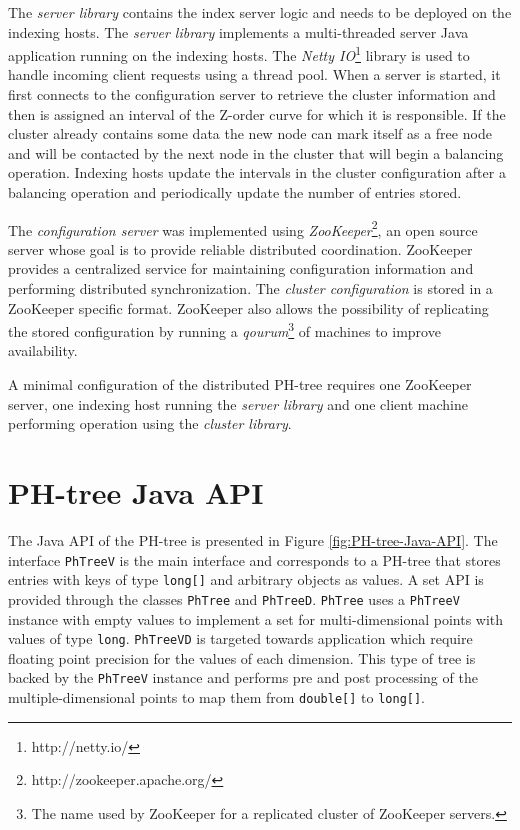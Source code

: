 \documentclass[11pt,a4paper]{globis-book}
\begin{document}
The \textit{server library} contains the index server logic and needs to be deployed on the indexing hosts. The \textit{server library} implements a multi-threaded server Java application running on the indexing hosts. The \textit{Netty IO}\footnote{http://netty.io/} library is used to handle incoming client requests using a thread pool. When a server is started, it first connects to the configuration server to retrieve the cluster information and then is assigned an interval of the Z-order curve for which it is responsible. If the cluster already contains some data the new node can mark itself as a free node and will be contacted by the next node in the cluster that will begin a balancing operation. Indexing hosts update the intervals in the cluster configuration after a balancing operation and periodically update the number of entries stored. 

The \textit{configuration server} was implemented using \textit{ZooKeeper}\footnote{http://zookeeper.apache.org/}, an open source server whose goal is to provide reliable distributed coordination. ZooKeeper provides a centralized service for maintaining configuration information and performing distributed synchronization. The \textit{cluster configuration} is stored in a ZooKeeper specific format. ZooKeeper also allows the possibility of replicating the stored configuration by running a \textit{qourum}\footnote{The name used by ZooKeeper for a replicated cluster of ZooKeeper servers.} of machines to improve availability. 

A minimal configuration of the distributed PH-tree requires one ZooKeeper server, one indexing host running the \textit{server library} and one client machine performing operation using the \textit{cluster library}.

\section{PH-tree Java API}

The Java API of the PH-tree is presented in Figure \ref{fig:PH-tree-Java-API}. The interface \texttt{PhTreeV} is the main interface and corresponds to a PH-tree that stores entries with keys of type \texttt{long[]} and arbitrary objects as values. A set API is provided through the classes \texttt{PhTree} and \texttt{PhTreeD}. \texttt{PhTree} uses a \texttt{PhTreeV} instance with empty values to implement a set for multi-dimensional points with values of type \texttt{long}. \texttt{PhTreeVD} is targeted towards application which require floating point precision for the values of each dimension. This type of tree is backed by the \texttt{PhTreeV} instance and performs pre and post processing of the multiple-dimensional points to map them from \texttt{double[]} to \texttt{long[]}.
\end{document}
